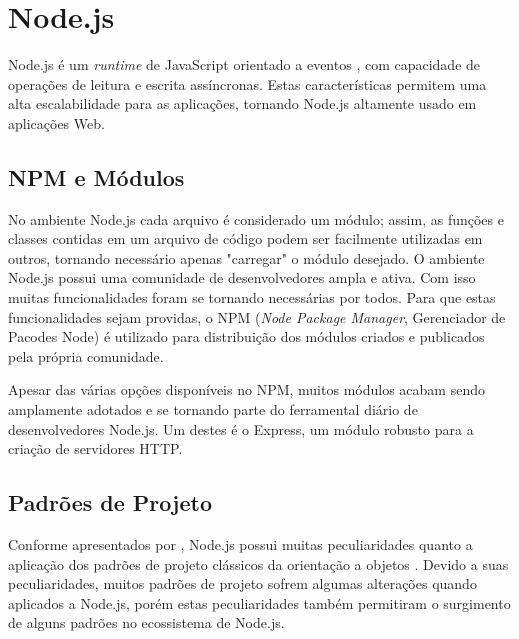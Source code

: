 
\section{Node.js}
\label{tec:node}

Node.js é um \textit{runtime} de JavaScript orientado a eventos \cite{NODEORG:2009}, com capacidade de operações de leitura e escrita assíncronas. Estas características permitem uma alta escalabilidade para as aplicações, tornando Node.js altamente usado em aplicações Web.


\subsection{NPM e Módulos}
\label{node:mod}

No ambiente Node.js cada arquivo é considerado um módulo; assim, as funções e classes contidas em um arquivo de código podem ser facilmente utilizadas em outros, tornando necessário apenas "carregar" o módulo desejado. O ambiente Node.js possui uma comunidade de desenvolvedores ampla e ativa. Com isso muitas funcionalidades foram se tornando necessárias por todos. Para que estas funcionalidades sejam providas, o NPM (\textit{Node Package Manager}, Gerenciador de Pacodes Node) é utilizado para distribuição dos módulos criados e publicados pela própria comunidade.

Apesar das várias opções disponíveis no NPM, muitos módulos acabam sendo amplamente adotados e se tornando parte do ferramental diário de desenvolvedores Node.js. Um destes é o Express, um módulo robusto para a criação de servidores HTTP.


\subsection{Padrões de Projeto}
\label{node:design}

Conforme apresentados por , Node.js possui muitas peculiaridades quanto a aplicação dos padrões de projeto clássicos da orientação a objetos \cite{GAMMA:1995}. Devido a suas peculiaridades, muitos padrões de projeto sofrem algumas alterações quando aplicados a Node.js, porém estas peculiaridades também permitiram o surgimento de alguns padrões no ecossistema de Node.js.

